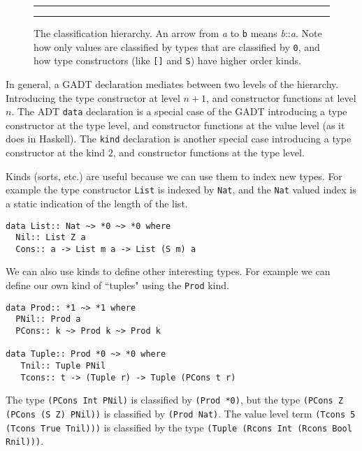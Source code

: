 \documentclass[11pt,twoside]{article}
\begin{document}
\begin{figure}
\hrule
\begin{center}
\end{center}
\vspace*{-.25in}
\caption{The classification hierarchy. 
An arrow from {\it a} to {\tt b} means {\it b}::{\it a}.
Note how only values are classified by types that are classified by
{\tt *0}, and how type constructors (like {\tt []} and {\tt S})
have higher order kinds.}
\hrule
\label{Kindtree}
\end{figure}

In general, a GADT declaration mediates between two levels of the hierarchy.
Introducing the type constructor at level $n+1$, and constructor functions at
level $n$. The ADT {\tt data} declaration is a special case of the GADT
introducing a type constructor at the type level, and constructor functions at the
value level (as it does in Haskell). The {\tt kind} declaration is another
special case introducing a type constructor at the kind $2$, and constructor
functions at the type level.



Kinds (sorts, etc.) are useful because we can use them to index new types. For example
the type constructor {\tt List} is indexed by {\tt Nat}, and the {\tt Nat} valued
index is a static indication of the length of the list.
\begin{verbatim}
data List:: Nat ~> *0 ~> *0 where 
  Nil:: List Z a
  Cons:: a -> List m a -> List (S m) a
\end{verbatim}
We can also use kinds to define other interesting types. For example
we can define our own kind of ``tuples" using the {\tt Prod} kind.
\begin{verbatim}
data Prod:: *1 ~> *1 where
  PNil:: Prod a
  PCons:: k ~> Prod k ~> Prod k
 
data Tuple:: Prod *0 ~> *0 where 
   Tnil:: Tuple PNil
   Tcons:: t -> (Tuple r) -> Tuple (PCons t r) 
\end{verbatim}
The type \verb+(PCons Int PNil)+ is classified
by \verb+(Prod *0)+, but the type \verb+(PCons Z (PCons (S Z) PNil))+ is classified
by \verb+(Prod Nat)+. The value level term \verb+(Tcons 5 (Tcons True Tnil)))+ is
classified by the type \verb+(Tuple (Rcons Int (Rcons Bool Rnil)))+.
\end{document}
